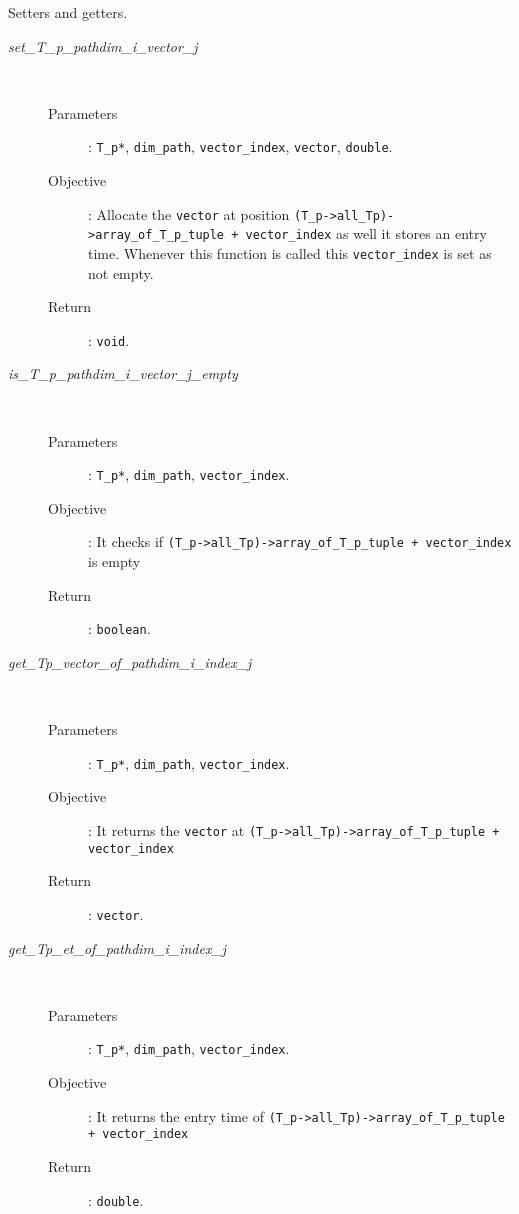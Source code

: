 \documentclass[11pt,a4paper]{article}
\begin{document}
Setters and getters.
\begin{description}
	\item [\textit{set\_T\_p\_pathdim\_i\_vector\_j}] \hfill \\[-0.5cm]
		\begin{description}
			\item [Parameters]: \texttt{T\_p*}, \texttt{dim\_path}, \texttt{vector\_index},
				\texttt{vector}, \texttt{double}.
			\item [Objective]: Allocate the \texttt{vector} at position 
				\texttt{(T\_p->all\_Tp)->array\_of\_T\_p\_tuple + vector\_index}
				as well it stores an entry time. Whenever this function
				is called this \texttt{vector\_index} is set as not empty.
			\item [Return]: \texttt{void}.
		\end{description}

	\item [\textit{is\_T\_p\_pathdim\_i\_vector\_j\_empty}] \hfill \\[-0.5cm]
		\begin{description}
			\item [Parameters]: \texttt{T\_p*}, \texttt{dim\_path}, \texttt{vector\_index}.
			\item [Objective]: It checks if
				\texttt{(T\_p->all\_Tp)->array\_of\_T\_p\_tuple + vector\_index}
				is empty
			\item [Return]: \texttt{boolean}.
		\end{description}

	\item [\textit{get\_Tp\_vector\_of\_pathdim\_i\_index\_j}] \hfill \\[-0.5cm]
		\begin{description}
			\item [Parameters]: \texttt{T\_p*}, \texttt{dim\_path}, \texttt{vector\_index}.
			\item [Objective]: It returns the \texttt{vector} at
				\texttt{(T\_p->all\_Tp)->array\_of\_T\_p\_tuple + vector\_index}
			\item [Return]: \texttt{vector}.
		\end{description}

	\item [\textit{get\_Tp\_et\_of\_pathdim\_i\_index\_j}] \hfill \\[-0.5cm]
		\begin{description}
			\item [Parameters]: \texttt{T\_p*}, \texttt{dim\_path}, \texttt{vector\_index}.
			\item [Objective]: It returns the entry time of
				\texttt{(T\_p->all\_Tp)->array\_of\_T\_p\_tuple + vector\_index}
			\item [Return]: \texttt{double}.
		\end{description}
\end{description}
\end{document}
